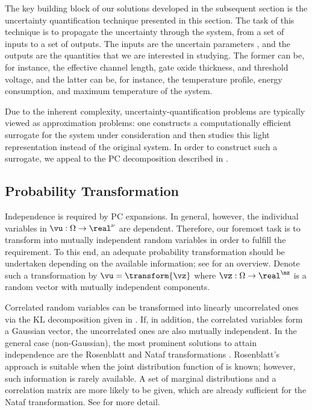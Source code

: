 The key building block of our solutions developed in the subsequent section is
the uncertainty quantification technique presented in this section. The task of
this technique is to propagate the uncertainty through the system, from a set of
inputs to a set of outputs. The inputs are the uncertain parameters \vu, and the
outputs are the quantities that we are interested in studying. The former can
be, for instance, the effective channel length, gate oxide thickness, and
threshold voltage, and the latter can be, for instance, the temperature profile,
energy consumption, and maximum temperature of the system.

Due to the inherent complexity, uncertainty-quantification problems are
typically viewed as approximation problems: one constructs a computationally
efficient surrogate for the system under consideration and then studies this
light representation instead of the original system. In order to construct such
a surrogate, we appeal to the \ac{PC} decomposition described in
.

\subsection{Probability Transformation}

Independence is required by \ac{PC} expansions. In general, however, the \nu
individual variables in $\vu: \Omega \to \real^\nu$ are dependent. Therefore,
our foremost task is to transform \vu into mutually independent random variables
in order to fulfill the requirement. To this end, an adequate probability
transformation should be undertaken depending on the available information; see
\cite{eldred2008} for an overview. Denote such a transformation by $\vu =
\transform{\vz}$ where $\vz: \Omega \to \real^\nz$ is a random vector with \nz
mutually independent components.

Correlated random variables can be transformed into linearly uncorrelated ones
via the \ac{KL} decomposition given in . If, in addition,
the correlated variables form a Gaussian vector, the uncorrelated ones are also
mutually independent. In the general case (non-Gaussian), the most prominent
solutions to attain independence are the Rosenblatt \cite{rosenblatt1952} and
Nataf transformations \cite{liu1986}. Rosenblatt's approach is suitable when the
joint distribution function of \vu is known; however, such information is rarely
available. A set of marginal distributions and a correlation matrix are more
likely to be given, which are already sufficient for the Nataf transformation.
See  for more detail.

